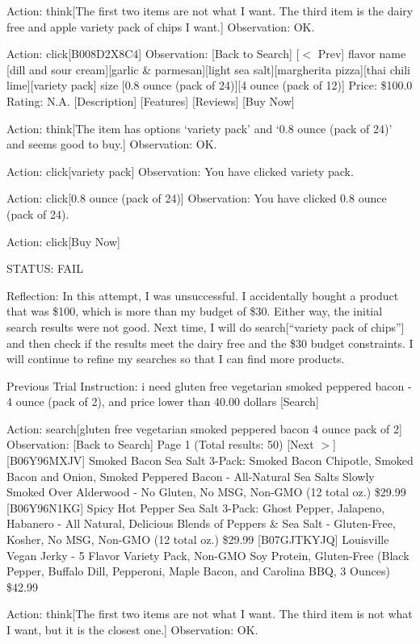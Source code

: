 {Action: think[The first two items are not what I want. The third item is the dairy free and apple variety pack of chips I want.]
Observation: OK.

Action: click[B008D2X8C4]
Observation:
[Back to Search]
[$<$ Prev]
flavor name [dill and sour cream][garlic \& parmesan][light sea salt][margherita pizza][thai chili lime][variety pack]
size [0.8 ounce (pack of 24)][4 ounce (pack of 12)]
Price: \$100.0
Rating: N.A.
[Description]
[Features]
[Reviews]
[Buy Now]

Action: think[The item has options `variety pack' and `0.8 ounce (pack of 24)' and seems good to buy.]
Observation: OK.

Action: click[variety pack]
Observation: You have clicked variety pack.

Action: click[0.8 ounce (pack of 24)]
Observation: You have clicked 0.8 ounce (pack of 24).

Action: click[Buy Now]

STATUS: FAIL

Reflection: In this attempt, I was unsuccessful. I accidentally bought a product that was \$100, which is more than my budget of \$30. Either way, the initial search results were not good. Next time, I will do search[``variety pack of chips''] and then check if the results meet the dairy free and the \$30 budget constraints. I will continue to refine my searches so that I can find more products.

Previous Trial
Instruction:
i need gluten free vegetarian smoked peppered bacon - 4 ounce (pack of 2), and price lower than 40.00 dollars
[Search]

Action: search[gluten free vegetarian smoked peppered bacon 4 ounce pack of 2]
Observation:
[Back to Search]
Page 1 (Total results: 50)
[Next $>$]
[B06Y96MXJV]
Smoked Bacon Sea Salt 3-Pack: Smoked Bacon Chipotle, Smoked Bacon and Onion, Smoked Peppered Bacon - All-Natural Sea Salts Slowly Smoked Over Alderwood - No Gluten, No MSG, Non-GMO (12 total oz.)
\$29.99
[B06Y96N1KG]
Spicy Hot Pepper Sea Salt 3-Pack: Ghost Pepper, Jalapeno, Habanero - All Natural, Delicious Blends of Peppers \& Sea Salt - Gluten-Free, Kosher, No MSG, Non-GMO (12 total oz.)
\$29.99
[B07GJTKYJQ]
Louisville Vegan Jerky - 5 Flavor Variety Pack, Non-GMO Soy Protein, Gluten-Free (Black Pepper, Buffalo Dill, Pepperoni, Maple Bacon, and Carolina BBQ, 3 Ounces)
\$42.99

Action: think[The first two items are not what I want. The third item is not what I want, but it is the closest one.]
Observation: OK.

}
